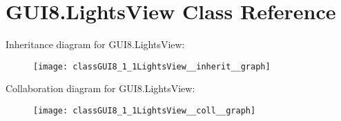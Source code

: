 \hypertarget{classGUI8_1_1LightsView}{}\section{G\+U\+I8.\+Lights\+View Class Reference}
\label{classGUI8_1_1LightsView}


Inheritance diagram for G\+U\+I8.\+Lights\+View\+:
\nopagebreak
\begin{figure}[H]
\begin{center}
\leavevmode
\texttt{[image: classGUI8\_1\_1LightsView\_\_inherit\_\_graph]}
\end{center}
\end{figure}


Collaboration diagram for G\+U\+I8.\+Lights\+View\+:
\nopagebreak
\begin{figure}[H]
\begin{center}
\leavevmode
\texttt{[image: classGUI8\_1\_1LightsView\_\_coll\_\_graph]}
\end{center}
\end{figure}
